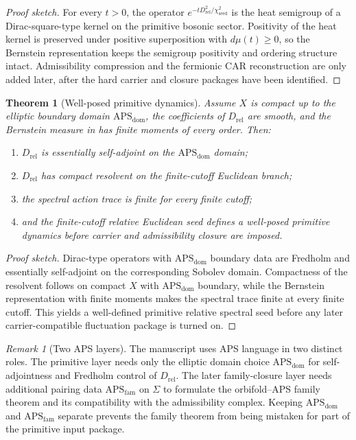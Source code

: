 \documentclass[11pt,a4paper]{article}
\newtheorem{theorem}{Theorem}[section]
\theoremstyle{definition}
\theoremstyle{remark}
\newtheorem*{remark}{Remark}
\newcommand{\Seam}{\Sigma}
\newcommand{\chiseed}{\chi_{\mathrm{seed}}}
\newcommand{\APSdom}{\mathrm{APS}_{\mathrm{dom}}}
\newcommand{\APSfam}{\mathrm{APS}_{\mathrm{fam}}}
\begin{document}
\begin{proof}[Proof sketch]
For every $t>0$, the operator $e^{-tD_{\mathrm{rel}}^2/\chiseed^2}$ is the heat semigroup of a Dirac-square-type kernel on the primitive bosonic sector. Positivity of the heat kernel is preserved under positive superposition with $d\mu(t)\ge0$, so the Bernstein representation keeps the semigroup positivity and ordering structure intact. Admissibility compression and the fermionic CAR reconstruction are only added later, after the hard carrier and closure packages have been identified.
\end{proof}

\begin{theorem}[Well-posed primitive dynamics]
Assume $X$ is compact up to the elliptic boundary domain $\APSdom$, the coefficients of $D_{\mathrm{rel}}$ are smooth, and the Bernstein measure in  has finite moments of every order. Then:
\begin{enumerate}[label=(\alph*), leftmargin=1.5em, topsep=3pt, itemsep=2pt]
    \item $D_{\mathrm{rel}}$ is essentially self-adjoint on the $\APSdom$ domain;
    \item $D_{\mathrm{rel}}$ has compact resolvent on the finite-cutoff Euclidean branch;
    \item the spectral action trace is finite for every finite cutoff;
    \item and the finite-cutoff relative Euclidean seed defines a well-posed primitive dynamics before carrier and admissibility closure are imposed.
\end{enumerate}
\end{theorem}

\begin{proof}[Proof sketch]
Dirac-type operators with $\APSdom$ boundary data are Fredholm and essentially self-adjoint on the corresponding Sobolev domain. Compactness of the resolvent follows on compact $X$ with $\APSdom$ boundary, while the Bernstein representation with finite moments makes the spectral trace finite at every finite cutoff. This yields a well-defined primitive relative spectral seed before any later carrier-compatible fluctuation package is turned on.
\end{proof}

\begin{remark}[Two APS layers]
The manuscript uses APS language in two distinct roles. The primitive layer needs only the elliptic domain choice $\APSdom$ for self-adjointness and Fredholm control of $D_{\mathrm{rel}}$. The later family-closure layer needs additional pairing data $\APSfam$ on $\Seam$ to formulate the orbifold--APS family theorem and its compatibility with the admissibility complex. Keeping $\APSdom$ and $\APSfam$ separate prevents the family theorem from being mistaken for part of the primitive input package.
\end{remark}
\end{document}
